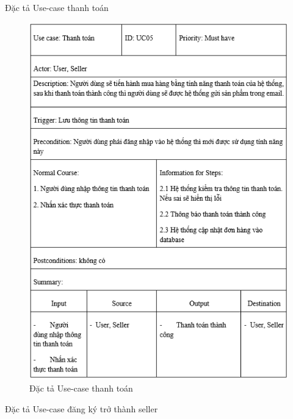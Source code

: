 \documentclass{article}
\begin{document}
{{{{\begin{center}
\begin{figure}[htp]
		\end{figure}
	\end{center}
\newpage
{\large Đặc tả Use-case thanh toán
	\begin{center}
		\begin{figure}[htp]
			\begin{center}
				\includegraphics[scale=.895]{anh14.png}
			\end{center}
			\caption{Đặc tả Use-case thanh toán}
			
		\end{figure}
	\end{center}
\newpage

{\large Đặc tả Use-case đăng ký trở thành seller
	
}}}}}}
\end{document}
